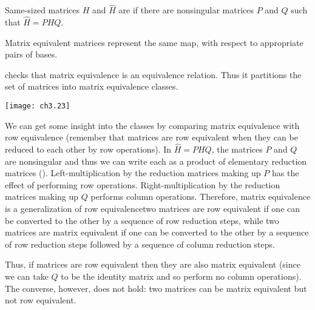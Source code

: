 \begin{definition}
\label{def:MatEquiv}
Same-sized matrices \( H \) and \( \hat{H} \) are
%
if there are nonsingular matrices \( P \) and \( Q \) such that
$\hat{H}=PHQ$.
\end{definition}

\begin{corollary}
\label{le:MatEqIsSameMap}
Matrix equivalent matrices represent the same map, with respect to appropriate
pairs of bases.
\end{corollary}

 checks that
matrix equivalence is an equivalence relation.
Thus it  partitions 
the set of matrices into matrix equivalence classes.
\begin{center}
  \texttt{[image: ch3.23]}
\end{center}
We can get some insight into the classes by comparing matrix equivalence
with row equivalence
(remember that matrices are row equivalent when they can be reduced to each
other by row operations).
In $\hat{H}=PHQ$, the matrices $P$ and $Q$ are nonsingular and 
thus we can write each as a product of elementary reduction matrices
().
Left-multiplication by the reduction matrices making up $P$
has the effect of performing row operations.
Right-multiplication by the reduction matrices making up $Q$
performs column operations.
Therefore, matrix equivalence is a generalization of row equivalence\Dash two
matrices are row equivalent if one can be converted to the other by
a sequence of row reduction steps, while
two matrices are matrix equivalent if one can be converted to the other by a 
sequence of row reduction steps followed by a sequence of column reduction
steps. 

Thus, if matrices are row equivalent then they are also
matrix equivalent (since we can take $Q$ to be the identity matrix and so 
perform no column operations).
The converse, however, does not hold:
two matrices can be matrix equivalent but not row equivalent.

